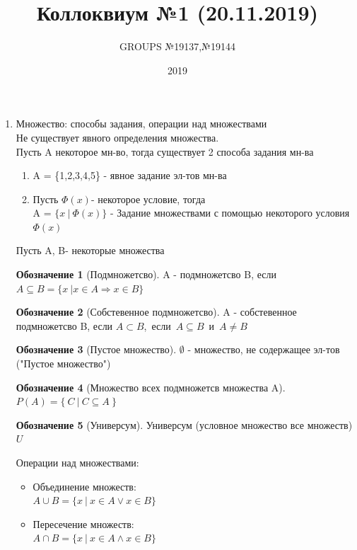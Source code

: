 \documentclass[a4paper]{article}
\title{ Коллоквиум №1 (20.11.2019) }
\author{GROUPS №19137,№19144}
\date{2019\\}
\theoremstyle{definition}
\newtheorem*{name}{Обозначение}
\begin{document}
\maketitle
\begin{enumerate}
 \item Множество: способы задания, операции над множествами
       \\ Не существует явного определения множества.
       \\ Пусть A некоторое мн-во, тогда существует 2 способа задания мн-ва
       \begin{enumerate}
        \item A = \{1,2,3,4,5\} - явное задание эл-тов мн-ва \\
        \item Пусть $\Phi(x)$- некоторое условие, тогда \\A = $\{x \ | \ \Phi(x) \}$ - Задание множествами с помощью некоторого условия $\Phi(x)$
       \end{enumerate}
       Пусть A, B- некоторые множества \\
       \begin{name}[Подмножетсво]
        A - подмножетсво B, если
        \mbox{$A \subseteq B = \{x \ | x\in{A} \Rightarrow x\in{B} \}$}
       \end{name}
       \begin{name}[Собстевенное подмножетсво]
        A - собстевенное подмножетсво B, если
        \mbox{$A \subset B$, если $A \subseteq B$ и $A\ne{B} $}
       \end{name}
       \begin{name}[Пустое множество]
        $\emptyset$ - множество, не содержащее эл-тов ("Пустое множество")
       \end{name}
       \begin{name}[Множество всех подмножетсв множества A]
        \mbox{$P(A) = \{ \ C\ |\ C \subseteq{A} \ \} $}
       \end{name}
       \begin{name}[Универсум]
        Универсум (условное множество все множеств) $U$
       \end{name}
       Операции над множествами:
       \begin{itemize}
        \item Объединение множеств:
              \\ $A\cup{B} = \{ x \ | \ x \in{A} \lor x\in{B}\}$
        \item Пересечение множеств:
              \\ $A\cap{B} = \{ x \ | \ x \in{A} \land x\in{B}\}$

\end{itemize}
\end{enumerate}
\end{document}
